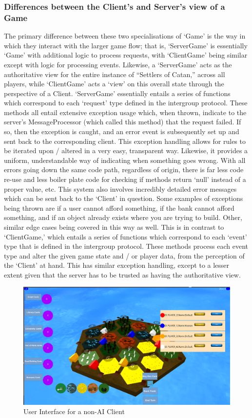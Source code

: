 \documentclass[a4paper,doc,draftfirst]{apa6}
\begin{document}
\subsubsection{Differences between the Client's and Server's view of a Game}
The primary difference between these two specialisations of ‘Game’ is the way in which they interact with the larger game flow; that is, ‘ServerGame’ is essentially ‘Game’ with additional logic to process requests, with ‘ClientGame’ being similar except with logic for processing events. Likewise, a ‘ServerGame’ acts as the authoritative view for the entire instance of “Settlers of Catan,” across all players, while ‘ClientGame’ acts a ‘view’ on this overall state through the perspective of a Client. ‘ServerGame’ essentially entails a series of functions which correspond to each ‘request’ type defined in the intergroup protocol. These methods all entail extensive exception usage which, when thrown, indicate to the server’s MessageProcessor (which called this method) that the request failed. If so, then the exception is caught, and an error event is subsequently set up and sent back to the corresponding client. This exception handling allows for rules to be iterated upon / altered in a very easy, transparent way. Likewise, it provides a uniform, understandable way of indicating when something goes wrong. With all errors going down the same code path, regardless of origin, there is far less code re-use and less boiler plate code for checking if methods return ‘null’ instead of a proper value, etc. This system also involves incredibly detailed error messages which can be sent back to the ‘Client’  in question. Some examples of exceptions being thrown are if a user cannot afford something, if the bank cannot afford something, and if an object already exists where you are trying to build. Other, similar edge cases being covered in this way as well. This is in contrast to ‘ClientGame,’ which entails a series of functions which correspond to each ‘event’ type that is defined in the intergroup protocol. These methods process each event type and alter the given game state and / or player data, from the perception of the ‘Client’ at hand. This has similar exception handling, except to a lesser extent given that the server has to be trusted as having the authoritative view.

\begin{figure}[hbtp]
      \includegraphics[width=\textwidth]{userInterface}
      \caption{User Interface for a non-AI Client}
\end{figure}
\end{document}
